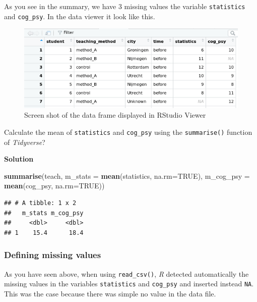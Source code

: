 \documentclass[
]{scrartcl}
\makeatletter
\newenvironment{Shaded}{\begin{snugshade}}{\end{snugshade}}
\newcommand{\AttributeTok}[1]{\textcolor[rgb]{0.13,0.29,0.53}{#1}}
\newcommand{\ConstantTok}[1]{\textcolor[rgb]{0.56,0.35,0.01}{#1}}
\newcommand{\FunctionTok}[1]{\textcolor[rgb]{0.13,0.29,0.53}{\textbf{#1}}}
\newcommand{\NormalTok}[1]{#1}
\newenvironment{kframe}{%
\medskip{}
\setlength{\fboxsep}{.8em}
 \def\at@end@of@kframe{}%
 \ifinner\ifhmode%
  \def\at@end@of@kframe{\end{minipage}}%
  \begin{minipage}{\columnwidth}%
 \fi\fi%
 \def\FrameCommand##1{\hskip\@totalleftmargin \hskip-\fboxsep
 \colorbox{shadecolor}{##1}\hskip-\fboxsep
     \hskip-\linewidth \hskip-\@totalleftmargin \hskip\columnwidth}%
 \MakeFramed {\advance\hsize-\width
   \@totalleftmargin\z@ \linewidth\hsize
   \@setminipage}}%
 {\par\unskip\endMakeFramed%
 \at@end@of@kframe}
\newenvironment{rmdblock}[1]
  {
  \begin{itemize}
  \renewcommand{\labelitemi}{
    \raisebox{-.7\height}[0pt][0pt]{
      {\setkeys{Gin}{width=3em,keepaspectratio}\texttt{[image: images/\#1]}}
    }
  }
  \setlength{\fboxsep}{1em}
  \begin{kframe}
  \item
  }
  {
  \end{kframe}
  \end{itemize}
  }
\newenvironment{myexercise}
    {\begin{rmdblock}{exercise_green}}
    {\end{rmdblock}}
\newenvironment{webexsolution}[1]
    {\par\tiny\textbf{#1}}
    {\par}
\newcommand{\webexhide}[1]{\begin{webexsolution}{#1}}
\newcommand{\webexunhide}{\end{webexsolution}}
\makeatother
\begin{document}
As you see in the summary, we have 3 missing values the variable \texttt{statistics} and \texttt{cog\_psy}. In the data viewer it look like this.

\begin{figure}

{\centering \includegraphics[width=500px]{images/missings_unknown} 

}

\caption{Screen shot of the data frame displayed in RStudio Viewer}\label{fig:missingsscreenshort}
\end{figure}

\begin{myexercise}
Calculate the mean of \texttt{statistics} and \texttt{cog\_psy} using
the \texttt{summarise()} function of \emph{Tidyverse}?
\end{myexercise}
\webexhide{Solution}

\begin{Shaded}
\begin{Highlighting}[]
\FunctionTok{summarise}\NormalTok{(teach, }\AttributeTok{m\_stats =} \FunctionTok{mean}\NormalTok{(statistics, }\AttributeTok{na.rm=}\ConstantTok{TRUE}\NormalTok{),}
          \AttributeTok{m\_cog\_psy =} \FunctionTok{mean}\NormalTok{(cog\_psy, }\AttributeTok{na.rm=}\ConstantTok{TRUE}\NormalTok{))}
\end{Highlighting}
\end{Shaded}

\begin{verbatim}
## # A tibble: 1 x 2
##   m_stats m_cog_psy
##     <dbl>     <dbl>
## 1    15.4      18.4
\end{verbatim}

\webexunhide

\subsubsection{Defining missing values}\label{defining-missing-values}

As you have seen above, when using \texttt{read\_csv()}, \emph{R} detected automatically the missing values in the variables \texttt{statistics} and \texttt{cog\_psy} and inserted instead \texttt{NA}. This was the case because there was simple no value in the data file.
\end{document}
